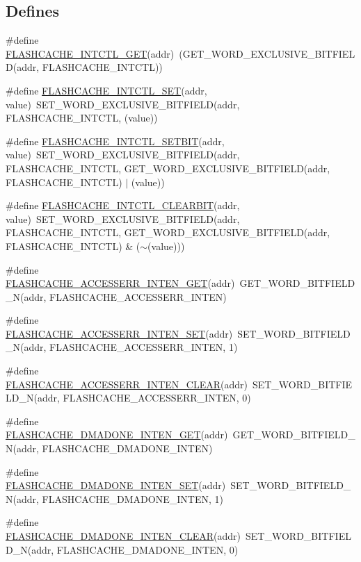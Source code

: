 \subsection*{Defines}
\begin{DoxyCompactItemize}
\item 
\#define \hyperlink{a00549_a46ccdca6d8c2165538e376a942fdc438}{FLASHCACHE\_\-INTCTL\_\-GET}(addr)~(GET\_\-WORD\_\-EXCLUSIVE\_\-BITFIELD(addr, FLASHCACHE\_\-INTCTL))
\item 
\#define \hyperlink{a00549_ab09c6fed0d34551df40ec8f30b506f32}{FLASHCACHE\_\-INTCTL\_\-SET}(addr, value)~SET\_\-WORD\_\-EXCLUSIVE\_\-BITFIELD(addr, FLASHCACHE\_\-INTCTL, (value))
\item 
\#define \hyperlink{a00549_a4e73d12c327abd516a346fae04004714}{FLASHCACHE\_\-INTCTL\_\-SETBIT}(addr, value)~SET\_\-WORD\_\-EXCLUSIVE\_\-BITFIELD(addr, FLASHCACHE\_\-INTCTL, GET\_\-WORD\_\-EXCLUSIVE\_\-BITFIELD(addr, FLASHCACHE\_\-INTCTL) $|$ (value))
\item 
\#define \hyperlink{a00549_ac4d49ab216f8bec89b05ddfd185e4cae}{FLASHCACHE\_\-INTCTL\_\-CLEARBIT}(addr, value)~SET\_\-WORD\_\-EXCLUSIVE\_\-BITFIELD(addr, FLASHCACHE\_\-INTCTL, GET\_\-WORD\_\-EXCLUSIVE\_\-BITFIELD(addr, FLASHCACHE\_\-INTCTL) \& ($\sim$(value)))
\item 
\#define \hyperlink{a00549_a8d470322379d05806d9e6b89757f5c75}{FLASHCACHE\_\-ACCESSERR\_\-INTEN\_\-GET}(addr)~GET\_\-WORD\_\-BITFIELD\_\-N(addr, FLASHCACHE\_\-ACCESSERR\_\-INTEN)
\item 
\#define \hyperlink{a00549_a6bc63e89a2f35a5a3c2fd82f8d4458cc}{FLASHCACHE\_\-ACCESSERR\_\-INTEN\_\-SET}(addr)~SET\_\-WORD\_\-BITFIELD\_\-N(addr, FLASHCACHE\_\-ACCESSERR\_\-INTEN, 1)
\item 
\#define \hyperlink{a00549_a22cdf3e616759e967c7f0f2076724431}{FLASHCACHE\_\-ACCESSERR\_\-INTEN\_\-CLEAR}(addr)~SET\_\-WORD\_\-BITFIELD\_\-N(addr, FLASHCACHE\_\-ACCESSERR\_\-INTEN, 0)
\item 
\#define \hyperlink{a00549_ac87d7aec048987b52a7b0aee23349a34}{FLASHCACHE\_\-DMADONE\_\-INTEN\_\-GET}(addr)~GET\_\-WORD\_\-BITFIELD\_\-N(addr, FLASHCACHE\_\-DMADONE\_\-INTEN)
\item 
\#define \hyperlink{a00549_a856e130e9838153a8b44aedc57264d8a}{FLASHCACHE\_\-DMADONE\_\-INTEN\_\-SET}(addr)~SET\_\-WORD\_\-BITFIELD\_\-N(addr, FLASHCACHE\_\-DMADONE\_\-INTEN, 1)
\item 
\#define \hyperlink{a00549_abaf842de3e6defa4ba1352a622422916}{FLASHCACHE\_\-DMADONE\_\-INTEN\_\-CLEAR}(addr)~SET\_\-WORD\_\-BITFIELD\_\-N(addr, FLASHCACHE\_\-DMADONE\_\-INTEN, 0)

\end{DoxyCompactItemize}
